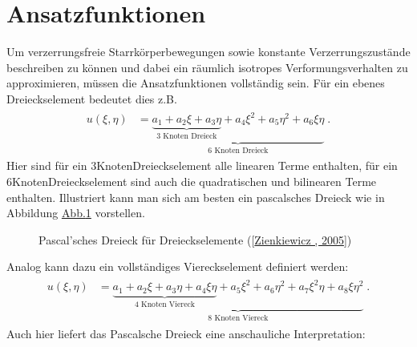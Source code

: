 \documentclass[letterpaper,10pt,german]{jupyterBook}
\begin{document}
\sphinxstepscope


\section{Ansatzfunktionen}
\label{\detokenize{chapters/chapter3/Ansatzfunktionen:ansatzfunktionen}}\label{\detokenize{chapters/chapter3/Ansatzfunktionen::doc}}
\sphinxAtStartPar
Um verzerrungsfreie Starrkörperbewegungen sowie konstante Verzerrungszustände beschreiben zu können und dabei ein räumlich isotropes Verformungsverhalten zu approximieren, müssen die Ansatzfunktionen vollständig sein.
Für ein ebenes Dreieckselement bedeutet dies z.B.
\begin{equation}\label{equation:chapters/chapter3/Ansatzfunktionen:ansatzfunktionenCompleteTriangle}
\begin{split}\begin{align}
u(\xi,\eta) &= \underbrace{\underbrace{ a_1 + a_2 \xi + a_3 \eta}_{\text{3 Knoten Dreieck}} + a_4 \xi^2 + a_5 \eta^2 + a_6 \xi \eta}_{\text{6 Knoten Dreieck}} \; .
\end{align}\end{split}
\end{equation}
\sphinxAtStartPar
Hier sind für ein 3\sphinxhyphen{}Knoten\sphinxhyphen{}Dreieckselement alle linearen Terme enthalten, für ein 6\sphinxhyphen{}Knoten\sphinxhyphen{}Dreieckselement sind auch die quadratischen und bilinearen Terme enthalten.
Illustriert kann man sich am besten ein pascalsches Dreieck wie in Abbildung \hyperref[\detokenize{chapters/chapter3/Ansatzfunktionen:pascaltriangle}]{Abb.\@ \ref{\detokenize{chapters/chapter3/Ansatzfunktionen:pascaltriangle}}} vorstellen.

\begin{figure}[htbp]
\centering
\capstart

\noindent{}
\caption{Pascal’sches Dreieck für Dreieckselemente ({[}\hyperlink{cite.quellen:id3}{Zienkiewicz , 2005}{]})}\label{\detokenize{chapters/chapter3/Ansatzfunktionen:pascaltriangle}}\end{figure}

\sphinxAtStartPar
Analog kann dazu ein vollständiges Viereckselement definiert werden:
\begin{equation}\label{equation:chapters/chapter3/Ansatzfunktionen:ansatzfunktionenCompleteQuad}
\begin{split}\begin{align}
u(\xi,\eta) &= \underbrace{\underbrace{ a_1 + a_2 \xi + a_3 \eta + a_4 \xi \eta}_{\text{4 Knoten Viereck}} + a_5 \xi^2 + a_6 \eta^2 + a_7 \xi^2 \eta + a_8 \xi \eta^2}_{\text{8 Knoten Viereck}} \; .
\end{align}\end{split}
\end{equation}
\sphinxAtStartPar
Auch hier liefert das Pascalsche Dreieck eine anschauliche Interpretation:
\end{document}
